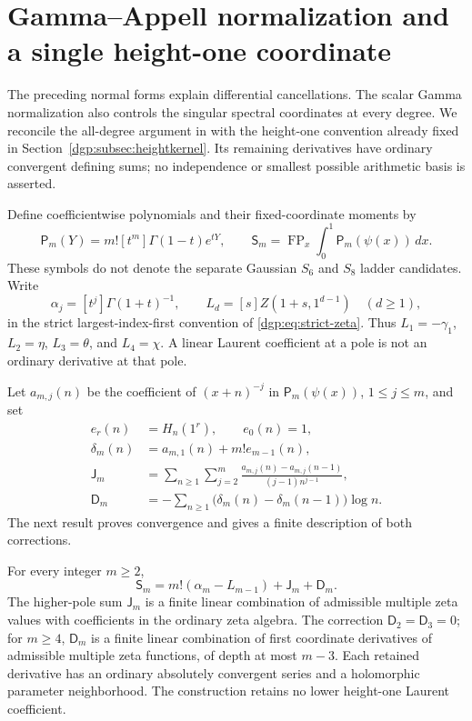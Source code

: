 
\section{Gamma--Appell normalization and a single height-one coordinate}
\label{gat:section}

The preceding normal forms explain differential cancellations.  The
scalar Gamma normalization also controls the singular spectral
coordinates at every degree.  We reconcile the all-degree argument in
\cite{dpm:reports} with the height-one convention already fixed in
Section~\ref{dgp:subsec:heightkernel}.  Its remaining derivatives have
ordinary convergent defining sums; no independence or smallest possible
arithmetic basis is asserted.

Define coefficientwise polynomials and their fixed-coordinate moments by
\[
 \mathsf P_m(Y)=m![t^m]\Gamma(1-t)e^{tY},\qquad
 \mathsf S_m=\operatorname{FP}_x\int_0^1\mathsf P_m(\psi(x))\,dx.
\]
These symbols do not denote the separate Gaussian $S_6$ and $S_8$
ladder candidates.  Write
\[
 \alpha_j=[t^j]\Gamma(1+t)^{-1},\qquad
 L_d=[s]Z(1+s,1^{d-1})\quad(d\ge1),
\]
in the strict largest-index-first convention of
\eqref{dgp:eq:strict-zeta}.  Thus $L_1=-\gamma_1$, $L_2=\eta$,
$L_3=\theta$, and $L_4=\chi$.  A linear Laurent coefficient at a
pole is not an ordinary derivative at that pole.

Let $a_{m,j}(n)$ be the coefficient of $(x+n)^{-j}$ in
$\mathsf P_m(\psi(x))$, $1\le j\le m$, and set
\begin{align*}
 e_r(n)&=H_n(1^r),\qquad e_0(n)=1,\\
 \delta_m(n)&=a_{m,1}(n)+m!e_{m-1}(n),\\
 \mathsf J_m&=\sum_{n\ge1}\sum_{j=2}^m
       \frac{a_{m,j}(n)-a_{m,j}(n-1)}{(j-1)n^{j-1}},\\
 \mathsf D_m&=-\sum_{n\ge1}
       \bigl(\delta_m(n)-\delta_m(n-1)\bigr)\log n.
\end{align*}
The next result proves convergence and gives a finite description of
both corrections.

\begin{theorem}
\label{gat:main}
For every integer $m\ge2$,
\begin{equation}\label{gat:spectral}
 \boxed{\mathsf S_m=m!(\alpha_m-L_{m-1})
                          +\mathsf J_m+\mathsf D_m.}
\end{equation}
The higher-pole sum $\mathsf J_m$ is a finite linear combination of
admissible multiple zeta values with coefficients in the ordinary zeta
algebra.  The correction $\mathsf D_2=\mathsf D_3=0$; for $m\ge4$,
$\mathsf D_m$ is a finite linear combination of first coordinate
derivatives of admissible multiple zeta functions, of depth at most
$m-3$.  Each retained derivative has an ordinary absolutely convergent
series and a holomorphic parameter neighborhood.  The construction
retains no lower height-one Laurent coefficient.
\end{theorem}

